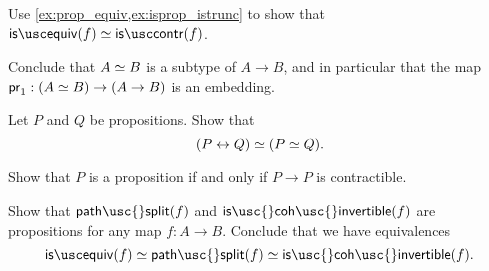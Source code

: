\begin{exercises}
\begin{subexenum}
\item Use \cref{ex:prop_equiv,ex:isprop_istrunc} to show that $\isequiv(f)\eqvsym \iscontr(f)$.
\end{subexenum}
Conclude that $\eqv{A}{B}$ is a subtype of $A\to B$, and in particular that the map $\proj 1 : (\eqv{A}{B})\to (A\to B)$ is an embedding.
\item \label{ex:prop_equiv}
\begin{subexenum}
\item \label{ex:equiv-bi-implication}Let $P$ and $Q$ be propositions. Show that
\begin{equation*}
\eqv{(P\leftrightarrow Q)}{(\eqv{P}{Q})}.
\end{equation*}
\item Show that $P$ is a proposition if and only if $P\to P$ is contractible.
\end{subexenum}
\item Show that $\mathsf{path\usc{}split}(f)$ and $\mathsf{is\usc{}coh\usc{}invertible}(f)$ are propositions for any map $f:A\to B$. Conclude that we have equivalences
  \begin{equation*}
    \isequiv(f) \eqvsym \mathsf{path\usc{}split}(f) \eqvsym \mathsf{is\usc{}coh\usc{}invertible}(f).
  \end{equation*}

\end{exercises}

